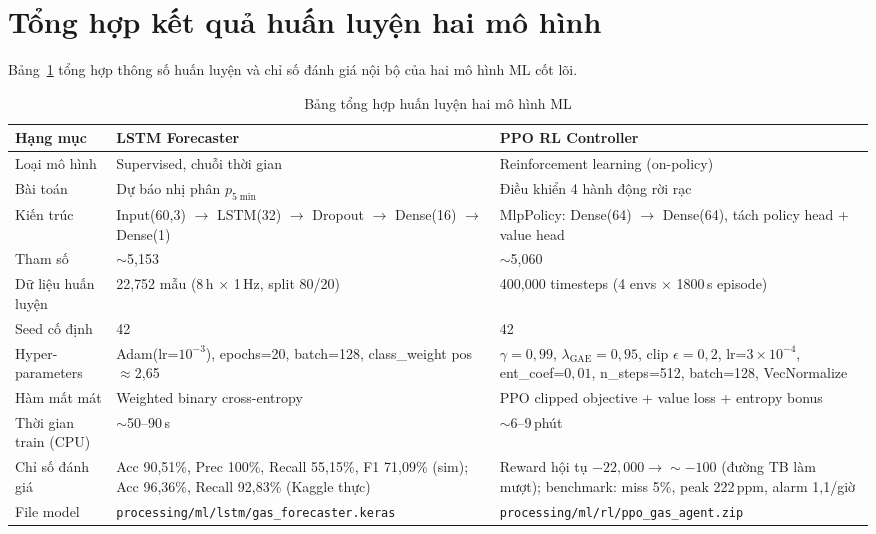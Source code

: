 \section{Tổng hợp kết quả huấn luyện hai mô hình}
\label{sec:training_summary}

Bảng~\ref{tab:training_summary} tổng hợp thông số huấn luyện và chỉ số đánh giá nội bộ của hai mô hình ML cốt lõi.

\begin{table}[H]
\centering
\caption{Bảng tổng hợp huấn luyện hai mô hình ML}
\label{tab:training_summary}
\begin{tabular}{p{4.2cm}p{4.6cm}p{4.6cm}}
\toprule
\textbf{Hạng mục} & \textbf{LSTM Forecaster} & \textbf{PPO RL Controller} \\
\midrule
Loại mô hình     & Supervised, chuỗi thời gian & Reinforcement learning (on-policy) \\
Bài toán         & Dự báo nhị phân $p_{5\min}$ & Điều khiển 4 hành động rời rạc \\
Kiến trúc        & Input(60,3) $\to$ LSTM(32) $\to$ Dropout $\to$ Dense(16) $\to$ Dense(1) & MlpPolicy: Dense(64) $\to$ Dense(64), tách policy head + value head \\
Tham số          & $\sim$5{,}153 & $\sim$5{,}060 \\
Dữ liệu huấn luyện & 22{,}752 mẫu (8\,h $\times$ 1\,Hz, split 80/20) & 400{,}000 timesteps (4 envs $\times$ 1800\,s episode) \\
Seed cố định     & 42 & 42 \\
Hyper-parameters & Adam(lr=$10^{-3}$), epochs=20, batch=128, class\_weight pos$\approx$2{,}65 & $\gamma=0{,}99$, $\lambda_{\mathrm{GAE}}=0{,}95$, clip $\epsilon=0{,}2$, lr=$3\times10^{-4}$, ent\_coef=$0{,}01$, n\_steps=512, batch=128, VecNormalize \\
Hàm mất mát      & Weighted binary cross-entropy & PPO clipped objective + value loss + entropy bonus \\
Thời gian train (CPU) & $\sim$50--90\,s & $\sim$6--9\,phút \\
Chỉ số đánh giá  & Acc 90{,}51\%, Prec 100\%, Recall 55{,}15\%, F1 71{,}09\% (sim); Acc 96{,}36\%, Recall 92{,}83\% (Kaggle thực) & Reward hội tụ $-22{,}000 \to \sim-100$ (đường TB làm mượt); benchmark: miss 5\%, peak 222\,ppm, alarm 1{,}1/giờ \\
File model       & \texttt{processing/ml/lstm/gas\_forecaster.keras} & \texttt{processing/ml/rl/ppo\_gas\_agent.zip} \\
\bottomrule
\end{tabular}
\end{table}

